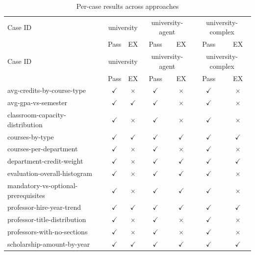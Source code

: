 \begin{longtable}{lcccccc}
\caption{Per-case results across approaches}
\label{tab:per-case} \\
\toprule
Case ID & \multicolumn{2}{c}{university} & \multicolumn{2}{c}{university-agent} & \multicolumn{2}{c}{university-complex} \\
 & Pass & EX & Pass & EX & Pass & EX \\
\midrule
\endfirsthead
\toprule
Case ID & \multicolumn{2}{c}{university} & \multicolumn{2}{c}{university-agent} & \multicolumn{2}{c}{university-complex} \\
 & Pass & EX & Pass & EX & Pass & EX \\
\midrule
\endhead
\bottomrule
\endfoot
avg-credits-by-course-type & $\checkmark$ & $\times$ & $\checkmark$ & $\times$ & $\checkmark$ & $\times$ \\
avg-gpa-vs-semester & $\checkmark$ & $\checkmark$ & $\checkmark$ & $\times$ & $\checkmark$ & $\times$ \\
classroom-capacity-distribution & $\checkmark$ & $\times$ & $\checkmark$ & $\times$ & $\checkmark$ & $\times$ \\
courses-by-type & $\checkmark$ & $\checkmark$ & $\checkmark$ & $\checkmark$ & $\checkmark$ & $\checkmark$ \\
courses-per-department & $\checkmark$ & $\times$ & $\checkmark$ & $\times$ & $\checkmark$ & $\times$ \\
department-credit-weight & $\checkmark$ & $\times$ & $\checkmark$ & $\checkmark$ & $\checkmark$ & $\checkmark$ \\
evaluation-overall-histogram & $\checkmark$ & $\times$ & $\checkmark$ & $\checkmark$ & $\checkmark$ & $\times$ \\
mandatory-vs-optional-prerequisites & $\checkmark$ & $\times$ & $\checkmark$ & $\checkmark$ & $\checkmark$ & $\times$ \\
professor-hire-year-trend & $\checkmark$ & $\checkmark$ & $\checkmark$ & $\checkmark$ & $\checkmark$ & $\checkmark$ \\
professor-title-distribution & $\checkmark$ & $\times$ & $\checkmark$ & $\times$ & $\checkmark$ & $\times$ \\
professors-with-no-sections & $\checkmark$ & $\times$ & $\checkmark$ & $\times$ & $\checkmark$ & $\times$ \\
scholarship-amount-by-year & $\checkmark$ & $\checkmark$ & $\checkmark$ & $\checkmark$ & $\checkmark$ & $\checkmark$ \\

\end{longtable}
